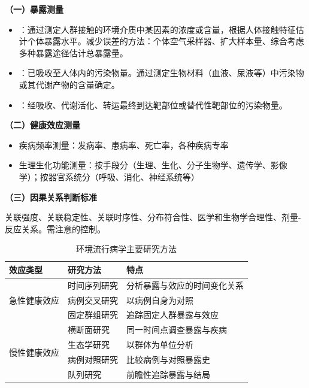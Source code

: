 \documentclass[10pt,a4paper,oneside]{ctexbook}
\begin{document}
\textbf{（一）暴露测量}

\begin{itemize}[leftmargin=*]
    \item {}：通过测定人群接触的环境介质中某因素的浓度或含量，根据人体接触特征估计个体暴露水平。减少误差的方法：个体空气采样器、扩大样本量、综合考虑多种暴露途径估计总暴露量。
    \item {}：已吸收至人体内的污染物量。通过测定生物材料（血液、尿液等）中污染物或其代谢产物的含量确定。
    \item {}：经吸收、代谢活化、转运最终到达靶部位或替代性靶部位的污染物量。
\end{itemize}

\textbf{（二）健康效应测量}

\begin{itemize}[leftmargin=*]
    \item 疾病频率测量：发病率、患病率、死亡率，各种疾病专率
    \item 生理生化功能测量：按手段分（生理、生化、分子生物学、遗传学、影像学）；按器官系统分（呼吸、消化、神经系统等）
\end{itemize}

\textbf{（三）因果关系判断标准}

关联强度、关联稳定性、关联时序性、分布符合性、医学和生物学合理性、剂量-反应关系。需注意的控制。

\begin{table}[htbp]
\centering
\caption{环境流行病学主要研究方法}
\begin{tabularx}{\textwidth}{lXl}
\hline
\textbf{效应类型} & \textbf{研究方法} & \textbf{特点} \\
\hline
\multirow{3}{*}{急性健康效应} & 时间序列研究 & 分析暴露与效应的时间变化关系 \\
& 病例交叉研究 & 以病例自身为对照 \\
& 固定群组研究 & 追踪固定人群暴露与效应 \\
\hline
\multirow{4}{*}{慢性健康效应} & 横断面研究 & 同一时间点调查暴露与疾病 \\
& 生态学研究 & 以群体为单位分析 \\
& 病例对照研究 & 比较病例与对照暴露史 \\
& 队列研究 & 前瞻性追踪暴露与结局 \\
\hline
\end{tabularx}
\end{table}
\end{document}
